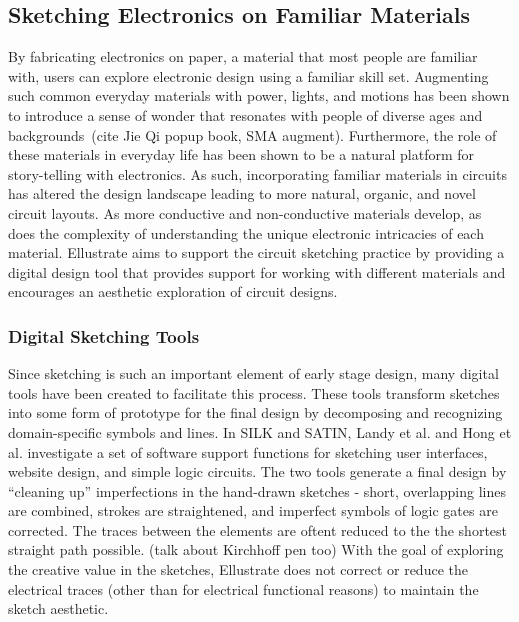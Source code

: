 \documentclass{sigchi}
\begin{document}
\subsection{Sketching Electronics on Familiar Materials}
By fabricating electronics on paper, a material that most people are familiar with, users can explore electronic design using a familiar skill set.  Augmenting such common everyday materials with power, lights, and motions has been shown to introduce a sense of wonder that resonates with people of diverse ages and backgrounds~\cite{karagozler_paper_2013}(cite Jie Qi popup book, SMA augment). Furthermore, the role of these materials in everyday life has been shown to be a natural platform for story-telling with electronics. As such, incorporating familiar materials in circuits has altered the design landscape leading to more natural, organic, and novel circuit layouts.
As more conductive and non-conductive materials develop, as does the complexity of understanding the unique electronic intricacies of each material.  Ellustrate aims to support the circuit sketching practice by providing a digital design tool that provides support for working with different materials and encourages an aesthetic exploration of circuit designs.




\subsubsection{Digital Sketching Tools} 
Since sketching is such an important element of early stage design, many digital tools have been created to facilitate this process. These tools transform sketches into some form of prototype for the final design by decomposing and recognizing domain-specific symbols and lines. In SILK and SATIN, Landy et al. and Hong et al. investigate a set of software support functions for sketching user interfaces, website design, and simple logic circuits. The two tools generate a final design by ``cleaning up'' imperfections in the hand-drawn sketches - short, overlapping lines are combined, strokes are straightened, and imperfect symbols of logic gates are corrected. The traces between the elements are oftent reduced to the the shortest straight path possible. (talk about Kirchhoff pen too) With the goal of exploring the creative value in the sketches, Ellustrate does not correct or reduce the electrical traces (other than for electrical functional reasons) to maintain the sketch aesthetic. 
\end{document}
